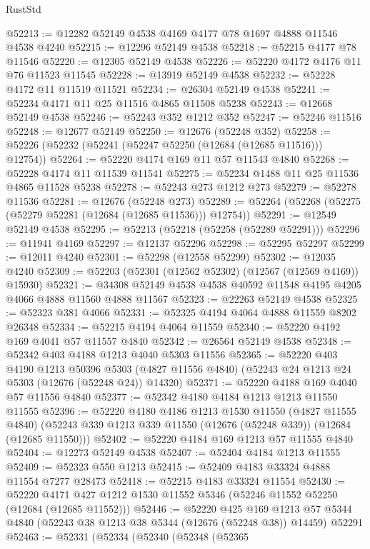 \begin{lexlean}{RustStd}
\begin{coremodule}
@52213 := @12282 @52149 @4538 @4169 @4177 @78 @1697 @4888 @11546 @4538 @4240
@52215 := @12296 @52149 @4538
@52218 := @52215 @4177 @78 @11546
@52220 := @12305 @52149 @4538
@52226 := @52220 @4172 @4176 @11 @76 @11523 @11545
@52228 := @13919 @52149 @4538
@52232 := @52228 @4172 @11 @11519 @11521
@52234 := @26304 @52149 @4538
@52241 := @52234 @4171 @11 @25 @11516 @4865 @11508 @5238
@52243 := @12668 @52149 @4538
@52246 := @52243 @352 @1212 @352
@52247 := @52246 @11516
@52248 := @12677 @52149
@52250 := @12676 (@52248 @352)
@52258 := @52226 (@52232 (@52241 (@52247 @52250 (@12684 (@12685 @11516))) @12754))
@52264 := @52220 @4174 @169 @11 @57 @11543 @4840
@52268 := @52228 @4174 @11 @11539 @11541
@52275 := @52234 @1488 @11 @25 @11536 @4865 @11528 @5238
@52278 := @52243 @273 @1212 @273
@52279 := @52278 @11536
@52281 := @12676 (@52248 @273)
@52289 := @52264 (@52268 (@52275 (@52279 @52281 (@12684 (@12685 @11536))) @12754))
@52291 := @12549 @52149 @4538
@52295 := @52213 (@52218 (@52258 (@52289 @52291)))
@52296 := @11941 @4169
@52297 := @12137 @52296
@52298 := @52295 @52297
@52299 := @12011 @4240
@52301 := @52298 (@12558 @52299)
@52302 := @12035 @4240
@52309 := @52203 (@52301 (@12562 @52302) (@12567 (@12569 @4169)) @15930)
@52321 := @34308 @52149 @4538 @4538 @40592 @11548 @4195 @4205 @4066 @4888 @11560 @4888 @11567
@52323 := @22263 @52149 @4538
@52325 := @52323 @381 @4066
@52331 := @52325 @4194 @4064 @4888 @11559 @8202 @26348
@52334 := @52215 @4194 @4064 @11559
@52340 := @52220 @4192 @169 @4041 @57 @11557 @4840
@52342 := @26564 @52149 @4538
@52348 := @52342 @403 @4188 @1213 @4040 @5303 @11556
@52365 := @52220
    @403
    @4190
    @1213
    @50396
    @5303
    (@4827 @11556 @4840)
    (@52243 @24 @1213 @24 @5303 (@12676 (@52248 @24)) @14320)
@52371 := @52220 @4188 @169 @4040 @57 @11556 @4840
@52377 := @52342 @4180 @4184 @1213 @1213 @11550 @11555
@52396 := @52220
    @4180
    @4186
    @1213
    @1530
    @11550
    (@4827 @11555 @4840)
    (@52243 @339 @1213 @339 @11550 (@12676 (@52248 @339)) (@12684 (@12685 @11550)))
@52402 := @52220 @4184 @169 @1213 @57 @11555 @4840
@52404 := @12273 @52149 @4538
@52407 := @52404 @4184 @1213 @11555
@52409 := @52323 @550 @1213
@52415 := @52409 @4183 @33324 @4888 @11554 @7277 @28473
@52418 := @52215 @4183 @33324 @11554
@52430 := @52220 @4171 @427 @1212 @1530 @11552 @5346 (@52246 @11552 @52250 (@12684 (@12685 @11552)))
@52446 := @52220
    @425
    @169
    @1213
    @57
    @5344
    @4840
    (@52243 @38 @1213 @38 @5344 (@12676 (@52248 @38)) @14459)
    @52291
@52463 := @52331
    (@52334
      (@52340
        (@52348
          (@52365

\end{coremodule}
\end{lexlean}
